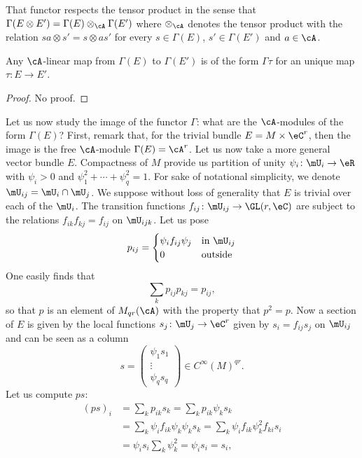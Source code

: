 That functor respects the tensor product in the sense that $\Gamma(E\otimes E')=\Gamma(E)\otimes_{\cA}\Gamma(E')$ where $\otimes_{\cA}$ denotes the tensor product with the relation $sa\otimes s'=s\otimes as'$ for every $s\in\Gamma(E)$, $s'\in\Gamma(E')$ and $a\in\cA$.

\begin{proposition}
	Any $\cA$-linear map from $\Gamma(E)$ to $\Gamma(E')$ is of the form $\Gamma\tau$ for an unique map $\tau\colon E\to E'$.
\end{proposition}

\begin{proof}
	No proof.
\end{proof}

Let us now study the image of the functor $\Gamma$: what are the $\cA$-modules of the form $\Gamma(E)$? First, remark that, for the trivial bundle $E=M\times\eC^r$, then the image is the free $\cA$-module $\Gamma(E)=\cA^r$. Let us now take a more general vector bundle $E$. Compactness of $M$ provide us partition of unity $\psi_i\colon  \mU_i\to \eR$ with $\psi_i>0$ and $\psi_1^2+\cdots+\psi_q^2=1$. For sake of notational simplicity, we denote $\mU_{ij}=\mU_i\cap\mU_j$.  We suppose without loss of generality that $E$ is trivial over each of the $\mU_i$. The transition functions $f_{ij}\colon \mU_{ij}\to \GL(r,\eC)$ are subject to the relations $f_{ik}f_{kj}=f_{ij}$ on $\mU_{ijk}$. Let us pose
\begin{equation}
	p_{ij}=
	\begin{cases}
		\psi_if_{ij}\psi_j & \text{in }\mU_{ij} \\
		0                  & \text{outside}
	\end{cases}
\end{equation}
One easily finds that
\[
	\sum_kp_{ij}p_{kj}=p_{ij},
\]
so that $p$ is an element of $M_{qr}(\cA)$ with the property that $p^2=p$. Now a section of $E$ is given by the local functions $s_j\colon \mU_j\to \eC^r$ given by $s_i=f_{ij}s_j$ on $\mU_{ij}$ and can be seen as a column
\begin{equation}
	s=
	\begin{pmatrix}
		\psi_1s_1 \\\vdots\\\psi_qs_q
	\end{pmatrix}\in C^{\infty}(M)^{qr}.
\end{equation}
Let us compute $ps$:
\[
	\begin{split}
		(ps)_i	&=\sum_kp_{ik}s_k
		=\sum_kp_{ik}\psi_ks_k\\
		&=\sum_k\psi_if_{ik}\psi_k\psi_ks_k
		=\sum_k\psi_if_{ik}\psi_k^2f_{ki}s_i\\
		&=\psi_is_i\sum_k\psi_k^2
		=\psi_is_i=s_i,
	\end{split}
\]
